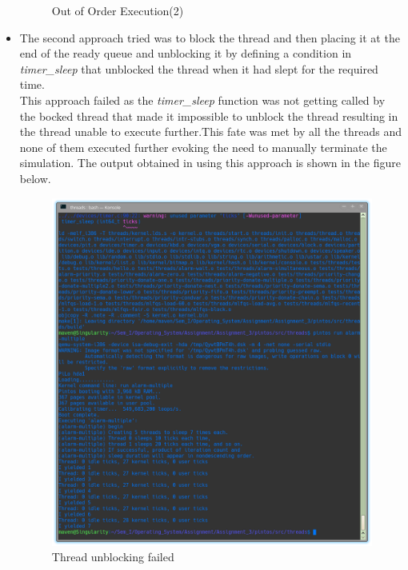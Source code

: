 \documentclass[]{article}
\begin{document}
\begin{itemize}
\begin{figure}[H]
				\caption{Out of Order Execution(2)}
			\end{figure}
			\item The second approach tried was to block the thread and then placing it at the end of the ready queue and unblocking it by defining a condition in \textit{timer\_sleep} that unblocked the thread when it had slept for the required time.\\
			This approach failed as the \textit{timer\_sleep} function was not getting called by the bocked thread that made it impossible to unblock the thread resulting in the thread unable to execute further.This fate was met by all the threads and none of them executed further evoking the need to manually terminate the simulation. The output obtained in using this approach is shown in the figure below.
			\begin{figure}[H]
				\centering
				\includegraphics[scale=0.3]{"timerThreadUnblockFailure"}
				\caption{Thread unblocking failed}
			\end{figure}
		\end{itemize}
		
\end{document}
